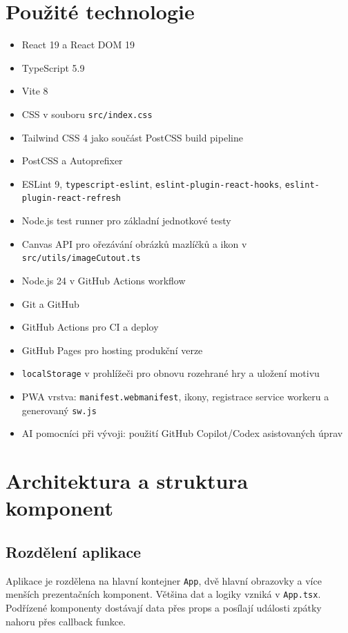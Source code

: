 \documentclass[12pt,a4paper]{article}
\begin{document}
\section{Použité technologie}

\begin{itemize}[leftmargin=2em]
  \item React 19 a React DOM 19
  \item TypeScript 5.9
  \item Vite 8
  \item CSS v souboru \texttt{src/index.css}
  \item Tailwind CSS 4 jako součást PostCSS build pipeline
  \item PostCSS a Autoprefixer
  \item ESLint 9, \texttt{typescript-eslint}, \texttt{eslint-plugin-react-hooks}, \texttt{eslint-plugin-react-refresh}
  \item Node.js test runner pro základní jednotkové testy
  \item Canvas API pro ořezávání obrázků mazlíčků a ikon v \texttt{src/utils/imageCutout.ts}
  \item Node.js 24 v GitHub Actions workflow
  \item Git a GitHub
  \item GitHub Actions pro CI a deploy
  \item GitHub Pages pro hosting produkční verze
  \item \texttt{localStorage} v prohlížeči pro obnovu rozehrané hry a uložení motivu
  \item PWA vrstva: \texttt{manifest.webmanifest}, ikony, registrace service workeru a generovaný \texttt{sw.js}
  \item AI pomocníci při vývoji: použití GitHub Copilot/Codex asistovaných úprav
\end{itemize}

\section{Architektura a struktura komponent}

\subsection*{Rozdělení aplikace}

Aplikace je rozdělena na hlavní kontejner \texttt{App}, dvě hlavní obrazovky a více menších prezentačních komponent. Většina dat a logiky vzniká v \texttt{App.tsx}. Podřízené komponenty dostávají data přes props a posílají události zpátky nahoru přes callback funkce.
\end{document}
